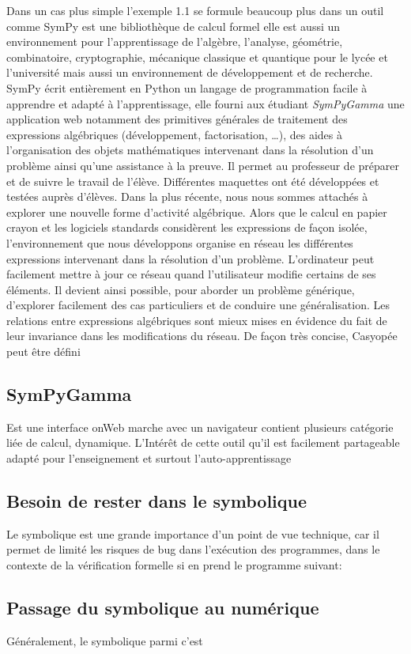 \documentclass[11pt,fleqn]{book} %
\begin{document}
Dans un cas plus simple l'exemple 1.1 se formule beaucoup plus dans un outil comme SymPy est une bibliothèque de calcul formel elle est aussi un environnement pour 
l’apprentissage de l’algèbre, l’analyse, géométrie, combinatoire, cryptographie, mécanique 
classique et quantique pour le lycée et l’université mais aussi un environnement de 
développement et de recherche. SymPy  écrit entièrement en Python un langage de 
programmation facile à apprendre et adapté à l’apprentissage,  elle fourni aux étudiant 
\textit{SymPyGamma} une application web   notamment des primitives générales de traitement des expressions algébriques (développement, factorisation, …), des aides à l’organisation des objets mathématiques intervenant dans la résolution d’un problème ainsi qu’une assistance à la preuve. Il permet au professeur de préparer et de suivre le travail de l’élève. Différentes maquettes ont été développées et testées auprès d’élèves. Dans la plus récente, nous nous sommes attachés à explorer une nouvelle forme d’activité algébrique. Alors que le calcul en papier crayon et les logiciels standards considèrent
 les expressions de façon isolée, l’environnement que nous développons organise en réseau les différentes expressions intervenant dans la résolution d’un problème. L’ordinateur peut facilement mettre à jour ce réseau quand l’utilisateur modifie certains de ses éléments. Il devient ainsi possible, pour aborder un problème générique, d’explorer facilement des cas particuliers et de conduire une généralisation. Les relations entre expressions algébriques sont mieux mises en évidence du fait de leur invariance dans les modifications du réseau. De façon très concise, Casyopée peut être défini
\subsection{SymPyGamma}
Est une interface onWeb marche avec un navigateur contient plusieurs catégorie liée de calcul, dynamique. L’Intérêt de cette outil qu'il est facilement partageable adapté pour l’enseignement et surtout l'auto-apprentissage 
\subsection{Besoin de rester dans le symbolique}
Le symbolique est une grande importance d'un point de vue technique, car il permet
de limité les risques de bug dans l'exécution des programmes, dans le contexte de 
la vérification formelle si en prend le programme suivant:

\subsection{Passage du symbolique au numérique}
Généralement, le symbolique parmi c'est  
\end{document}
